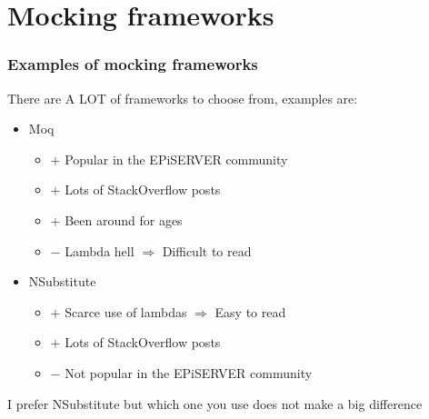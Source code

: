 \documentclass{beamer}
\begin{document}
	\section{Mocking frameworks}

		\begin{frame}
			\frametitle{Examples of mocking frameworks} \pause
			\begin{exampleblock}{There are A LOT of frameworks to choose from, examples are:} \pause
			\begin{itemize}
				\item Moq \pause
				\begin{itemize}
					\item $+$ Popular in the EPiSERVER community \pause
					\item $+$ Lots of StackOverflow posts \pause
					\item $+$ Been around for ages \pause
					\item $-$ Lambda hell $\Rightarrow$ Difficult to read \pause
				\end{itemize}
				\item NSubstitute \pause
				\begin{itemize}
					\item $+$ Scarce use of lambdas $\Rightarrow$ Easy to read \pause
					\item $+$ Lots of StackOverflow posts \pause
					\item $-$ Not popular in the EPiSERVER community \pause
				\end{itemize}
			\end{itemize}
			\end{exampleblock}

			\begin{exampleblock}{I prefer NSubstitute but which one you use does not make a big difference}
			\end{exampleblock}
		\end{frame}
\end{document}
